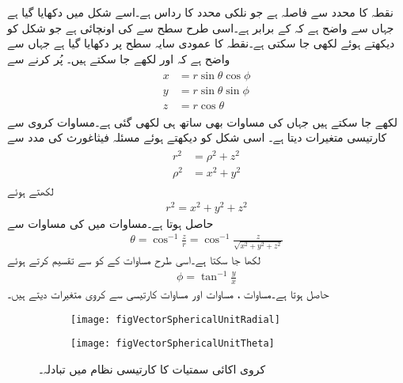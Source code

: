 نقطہ  کا  محدد سے فاصلہ   ہے جو نلکی محدد کا رداس ہے۔اسے شکل  میں دکھایا گیا ہے جہاں سے واضح ہے کہ  کے برابر ہے۔اسی طرح  سطح سے  کی اونچائی  ہے جو شکل کو دیکھتے ہوئے   لکھی جا سکتی ہے۔نقطہ  کا عمودی سایہ  سطح پر دکھایا گیا ہے جہاں سے واضح ہے کہ  اور  لکھے جا سکتے ہیں۔ پُر کرنے سے
\begin{gather}
\begin{aligned}\label{مساوات_سمتیہ_کروی_سے_کارتیسی}
x&=r \sin \theta \cos \phi\\
y&=r \sin \theta \sin \phi\\
z&=r \cos \theta
\end{aligned}
\end{gather}
لکھے جا سکتے ہیں جہاں  کی مساوات بھی ساتھ ہی لکھی  گئی ہے۔مساوات  کروی سے کارتیسی متغیرات دیتا ہے۔ اسی شکل کو دیکھتے ہوئے مسئلہ فیثاغورث کی مدد سے 
\begin{gather}
\begin{aligned}
r^2&=\rho^2+z^2\\
\rho^2&=x^2+y^2
\end{aligned}
\end{gather}
لکھتے ہوئے
\begin{align}\label{مساوات_سمتیہ_کروی_رداس}
r^2=x^2+y^2+z^2
\end{align}
حاصل ہوتا ہے۔مساوات  میں  کی مساوات سے
\begin{align}\label{مساوات_سمتیہ_کروی_تھیٹا}
\theta = \cos^{-1} \frac{z}{r}=\cos^{-1}\frac{z}{\sqrt{x^2+y^2+z^2}}
\end{align}
 لکھا جا سکتا ہے۔اسی طرح  مساوات  کے  کو  سے تقسیم کرتے ہوئے
\begin{align}\label{مساوات_سمتیہ_کروی_فائے}
\phi = \tan^{-1} \frac{y}{x}
\end{align}
حاصل ہوتا ہے۔مساوات ، مساوات  اور مساوات  کارتیسی سے کروی متغیرات دیتے ہیں۔
\begin{figure}
\centering
\begin{subfigure}{0.5\textwidth}
\centering
\texttt{[image: figVectorSphericalUnitRadial]}
\end{subfigure}%
%
\begin{subfigure}{0.5\textwidth}
\centering
\texttt{[image: figVectorSphericalUnitTheta]}
\end{subfigure}%
\caption{کروی اکائی سمتیات کا کارتیسی نظام میں تبادلہ۔}
\label{شکل_سمتیہ_کروی_اکائی_رداسی_سمتیہ_کارتیسی}
\end{figure}

